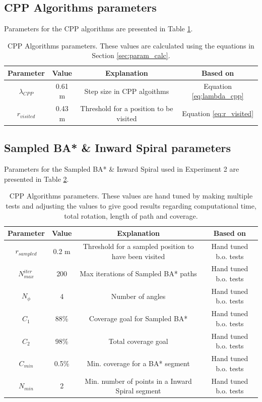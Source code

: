 \subsection{CPP Algorithms parameters}
Parameters for the CPP algorithms are presented in Table \ref{tab:cpp_parameters}.

\begin{table}[h!]
    \centering
    \caption{CPP Algorithms parameters. These values are calculated using the equations in Section \ref{sec:param_calc}.}
    \begin{tabular}{|c|c|c|c|}
        \hline 
        \textbf{Parameter} & \textbf{Value} & \textbf{Explanation} & \textbf{Based on} \\
        \hline 
        $\lambda_{CPP}$ & 0.61 m & Step size in CPP algoithms & Equation \ref{eq:lambda_cpp}\\
        $r_{visited}$ & 0.43 m & Threshold for a position to be visited & Equation \ref{eq:r_visited}\\
        \hline 
    \end{tabular}
    
    \label{tab:cpp_parameters}
\end{table}

\subsection{Sampled BA* \& Inward Spiral parameters}
Parameters for the Sampled BA* \& Inward Spiral used in Experiment 2 are presented in Table \ref{tab:sampled_parameters}.

\begin{table}[h!]
    \centering
    \caption{CPP Algorithms parameters. These values are hand tuned by making multiple tests and adjusting the values to give good results regarding computational time, total rotation, length of path and coverage.}
    \begin{tabular}{|c|c|c|c|}
        \hline 
        \textbf{Parameter} & \textbf{Value} & \textbf{Explanation} & \textbf{Based on} \\
        \hline 
        $r_{sampled}$ & 0.2 m & Threshold for a sampled position to have been visited & Hand tuned b.o. tests \\
        $N^{iter}_{max}$ & 200 & Max iterations of Sampled BA* paths & Hand tuned b.o. tests\\
        $N_{\phi}$ & 4 & Number of angles & Hand tuned b.o. tests\\
        $C_{1}$ & 88\% & Coverage goal for Sampled BA* & Hand tuned b.o. tests\\
        $C_{2}$ & 98\% & Total coverage goal & Hand tuned b.o. tests\\
        $C_{min}$ & 0.5\% & Min. coverage for a BA* segment & Hand tuned b.o. tests\\
        $N_{min}$ & 2 & Min. number of points in a Inward Spiral segment & Hand tuned b.o. tests\\
        
        \hline 
    \end{tabular}
    
    \label{tab:sampled_parameters}
\end{table}

